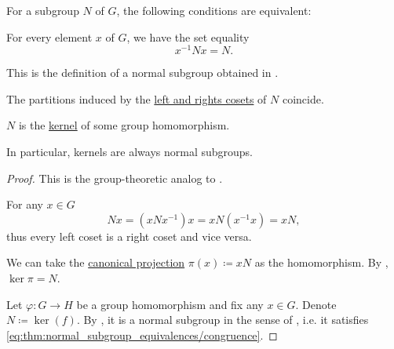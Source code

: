 \begin{proposition}\label{thm:normal_subgroup_equivalences}
  For a subgroup \( N \) of \( G \), the following conditions are equivalent:
  \begin{thmenum}
     For every element \( x \) of \( G \), we have the set equality
    \begin{equation}\label{eq:thm:normal_subgroup_equivalences/congruence}
      x^{-1} N x = N.
    \end{equation}

    This is the definition of a normal subgroup obtained in .

     The partitions induced by the \hyperref[def:subgroup_cosets]{left and rights cosets} of \( N \) coincide.

     \( N \) is the \hyperref[def:group/kernel]{kernel} of some group homomorphism.
  \end{thmenum}

  In particular, kernels are always normal subgroups.
\end{proposition}
\begin{proof}
  This is the group-theoretic analog to .

   For any \( x \in G \)
  \begin{equation*}
    N x = (x N x^{-1})x = x N(x^{-1}x) = x N,
  \end{equation*}
  thus every left coset is a right coset and vice versa.

   We can take the \hyperref[def:group/quotient]{canonical projection} \( \pi(x) \coloneqq x N \) as the homomorphism. By , \( \ker \pi = N \).

   Let \( \varphi: G \to H \) be a group homomorphism and fix any \( x \in G \). Denote \( N \coloneqq \ker(f) \). By , it is a normal subgroup in the sense of , i.e. it satisfies \eqref{eq:thm:normal_subgroup_equivalences/congruence}.
\end{proof}

